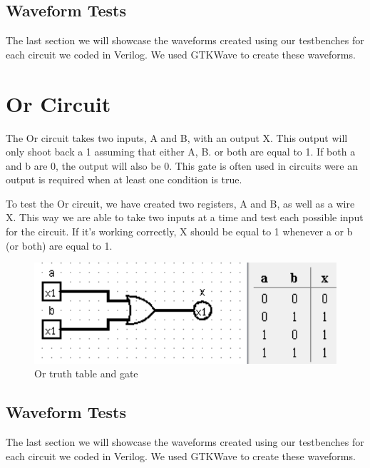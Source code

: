 \documentclass[12pt]{article}
\begin{document}
\newpage

\subsection{Waveform Tests}

The last section we will showcase the waveforms created using our testbenches for each circuit we coded in Verilog. We used GTKWave to create these waveforms.





\section{Or Circuit}
The Or circuit takes two inputs, A and B, with an output X. This output will only shoot back a 1 assuming that either A, B. or both are equal to 1. If both a and b are 0, the output will also be 0. This gate is often used in circuits were an output is required when at least one condition is true.


To test the Or circuit, we have created two registers, A and B, as well as a wire X. This way we are able to take two inputs at a time and test each possible input for the circuit. If it's working correctly, X should be equal to 1 whenever a or b (or both) are equal to 1.


\begin{figure}[h]
    \centering
    \includegraphics[width = 1.0\textwidth]{figs/or.png}
    \caption{Or truth table and gate}
    \label{fig:enter-label}
\end{figure}



\subsection{Waveform Tests}

The last section we will showcase the waveforms created using our testbenches for each circuit we coded in Verilog. We used GTKWave to create these waveforms.
\end{document}
